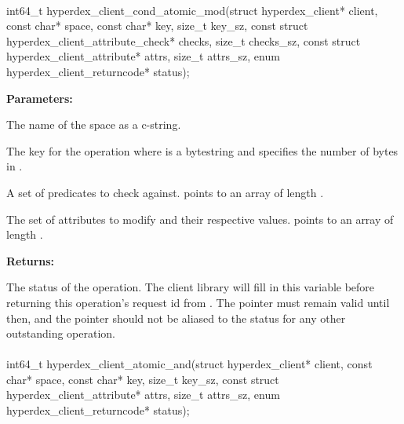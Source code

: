\paragraph{}
\label{api:c:cond_atomic_mod}
\begin{ccode}
int64_t hyperdex_client_cond_atomic_mod(struct hyperdex_client* client,
                const char* space,
                const char* key, size_t key_sz,
                const struct hyperdex_client_attribute_check* checks, size_t checks_sz,
                const struct hyperdex_client_attribute* attrs, size_t attrs_sz,
                enum hyperdex_client_returncode* status);
\end{ccode}
\funcdesc 

\noindent\textbf{Parameters:}
\begin{description}[labelindent=\widthof{{\code{checks}, \code{checks\_sz}}},leftmargin=*,noitemsep,nolistsep,align=right]
\item[\code{space}] The name of the space as a c-string.
\item[\code{key}, \code{key\_sz}] The key for the operation where  is a bytestring and  specifies the number of bytes in .
\item[\code{checks}, \code{checks\_sz}] A set of predicates to check against.   points to an array of length .
\item[\code{attrs}, \code{attrs\_sz}] The set of attributes to modify and their respective values.   points to an array of length .
\end{description}

\noindent\textbf{Returns:}
\begin{description}[labelindent=\widthof{{\code{status}}},leftmargin=*,noitemsep,nolistsep,align=right]
\item[\code{status}] The status of the operation.  The client library will fill in this variable before returning this operation's request id from .  The pointer must remain valid until then, and the pointer should not be aliased to the status for any other outstanding operation.
\end{description}

\paragraph{}
\label{api:c:atomic_and}
\begin{ccode}
int64_t hyperdex_client_atomic_and(struct hyperdex_client* client,
                const char* space,
                const char* key, size_t key_sz,
                const struct hyperdex_client_attribute* attrs, size_t attrs_sz,
                enum hyperdex_client_returncode* status);
\end{ccode}
\funcdesc 

